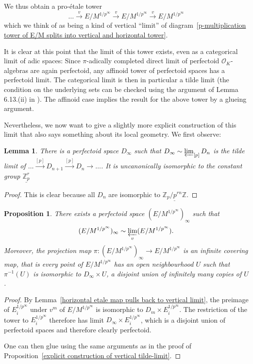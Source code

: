 \documentclass[10pt,oneside]{amsart}
\newtheorem{lemma}[theorem]{Lemma}
\newtheorem{proposition}[theorem]{Proposition}
\theoremstyle{definition}
\theoremstyle{remark}
\begin{document}
	We thus obtain a pro-\'etale tower
	\begin{equation}\label{proetale tower in the vertical limit}
	\dots \xrightarrow{v}E/M^{1/p^\infty}\xrightarrow{v} E/M^{1/p^\infty}\xrightarrow{v} E/M^{1/p^\infty}
	\end{equation}
	which we think of as being a kind of vertical ``limit'' of diagram~\ref{p-multiplication tower of E/M splits into vertical and horizontal tower}. 
	
	It is clear at this point that the limit of this tower exists, even as a categorical limit of adic spaces: Since $\pi$-adically completed direct limit of perfectoid $\mathcal O_K$-algebras are again perfectoid, any affinoid tower of perfectoid spaces has a perfectoid limit. The categorical limit is then in particular a tilde limit (the condition on the underlying sets can be checked using the argument of Lemma 6.13.(ii) in \cite{perfectoid IHES}). The affinoid case implies the result for the above tower by a glueing argument.
	
	Nevertheless, we now want to give a slightly more explicit construction of this limit that also says something about its local geometry. We first observe:
	\begin{lemma}
		There is a perfectoid space $D_\infty$ such that $D_\infty \sim \varprojlim_{[p]} D_n$ is the tilde limit of $\dots \xrightarrow{[p]}D_{n+1}\xrightarrow{[p]}D_n\rightarrow\dots$.   It is uncanonically isomorphic to the constant group $\underline {\mathbb Z_p^r}$
	\end{lemma}
	\begin{proof}
		This is clear because all $D_n$ are isomorphic to $\underline {\mathbb Z_p/p^{rn}\mathbb Z}$.
	\end{proof}
	\begin{proposition}\label{horizontal limit of vertical limit}
	There exists a perfectoid space $(E/M^{1/p^\infty})_\infty$ such that \[(E/M^{1/p^\infty})_\infty \sim \varprojlim_{v}(E/M^{1/p^\infty}).\]
	 Moreover, the projection map $\pi:(E/M^{1/p^\infty})_\infty\rightarrow E/M^{1/p^\infty}$ is an infinite covering map, that is every point of $E/M^{1/p^\infty}$ has an open neighbourhood $U$ such that $\pi^{-1}(U)$ is isomorphic to $D_\infty \times U$,  a disjoint union of infinitely many copies of $U$.
	\end{proposition}
	\begin{proof}
	By Lemma~\ref{horizontal etale map pulls back to vertical limit}, the preimage of $E_i^{1/p^\infty}$ under $v^m$ of $E/M^{1/p^\infty}$ is isomorphic to $D_m\times E_i^{1/p^\infty}$. The restriction of the tower to $E_i^{1/p^\infty}$ therefore has limit $D_\infty \times E_i^{1/p^\infty}$, which is a disjoint union of perfectoid spaces and therefore clearly perfectoid. 
	
	One can then glue using the same arguments as in the proof of Proposition~\ref{explicit construction of vertical tilde-limit}.
	\end{proof}
	
\end{document}
